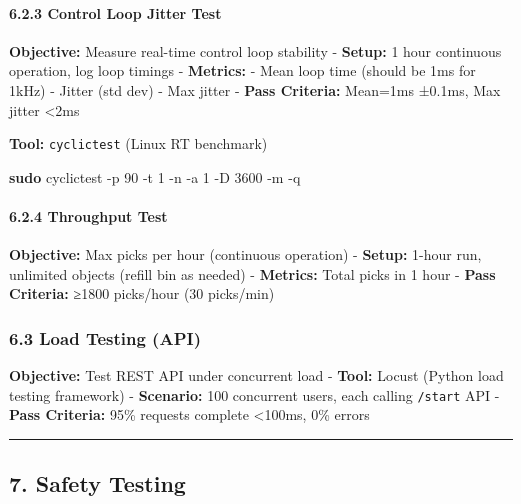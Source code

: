 \documentclass[
]{article}
\newenvironment{Shaded}{\begin{snugshade}}{\end{snugshade}}
\newcommand{\AttributeTok}[1]{\textcolor[rgb]{0.13,0.29,0.53}{#1}}
\newcommand{\FunctionTok}[1]{\textcolor[rgb]{0.13,0.29,0.53}{\textbf{#1}}}
\newcommand{\NormalTok}[1]{#1}
\begin{document}
\hypertarget{control-loop-jitter-test}{%
\paragraph{6.2.3 Control Loop Jitter
Test}\label{control-loop-jitter-test}}

\textbf{Objective:} Measure real-time control loop stability -
\textbf{Setup:} 1 hour continuous operation, log loop timings -
\textbf{Metrics:} - Mean loop time (should be 1ms for 1kHz) - Jitter
(std dev) - Max jitter - \textbf{Pass Criteria:} Mean=1ms ±0.1ms, Max
jitter \textless2ms

\textbf{Tool:} \texttt{cyclictest} (Linux RT benchmark)

\begin{Shaded}
\begin{Highlighting}[]
\FunctionTok{sudo}\NormalTok{ cyclictest }\AttributeTok{{-}p}\NormalTok{ 90 }\AttributeTok{{-}t}\NormalTok{ 1 }\AttributeTok{{-}n} \AttributeTok{{-}a}\NormalTok{ 1 }\AttributeTok{{-}D}\NormalTok{ 3600 }\AttributeTok{{-}m} \AttributeTok{{-}q}
\end{Highlighting}
\end{Shaded}

\hypertarget{throughput-test}{%
\paragraph{6.2.4 Throughput Test}\label{throughput-test}}

\textbf{Objective:} Max picks per hour (continuous operation) -
\textbf{Setup:} 1-hour run, unlimited objects (refill bin as needed) -
\textbf{Metrics:} Total picks in 1 hour - \textbf{Pass Criteria:} ≥1800
picks/hour (30 picks/min)

\hypertarget{load-testing-api}{%
\subsubsection{6.3 Load Testing (API)}\label{load-testing-api}}

\textbf{Objective:} Test REST API under concurrent load - \textbf{Tool:}
Locust (Python load testing framework) - \textbf{Scenario:} 100
concurrent users, each calling \texttt{/start} API - \textbf{Pass
Criteria:} 95\% requests complete \textless100ms, 0\% errors

\begin{center}\rule{0.5\linewidth}{0.5pt}\end{center}

\hypertarget{safety-testing}{%
\subsection{7. Safety Testing}\label{safety-testing}}
\end{document}
